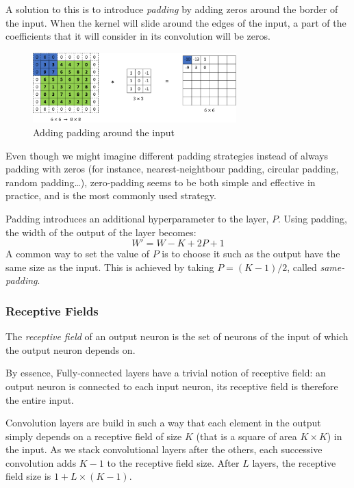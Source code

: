 A solution to this is to introduce \emph{padding} by adding zeros around the border of the input. When the kernel will slide around the edges of the input, a part of the coefficients that it will consider in its convolution will be zeros.
\begin{figure}[H]
    \centering
    \includegraphics[width=0.7\textwidth]{images/padding.png}
    \caption{Adding padding around the input}
\end{figure}

\begin{remark}
    Even though we might imagine different padding strategies instead of always padding with zeros (for instance, nearest-neightbour padding, circular padding, random padding\dots), zero-padding seems to be both simple and effective in practice, and is the most commonly used strategy.
\end{remark}

Padding introduces an additional hyperparameter to the layer, $P$. 
Using padding, the width of the output of the layer becomes:
\begin{equation}
    \label{eq:output-padding}
    W'=W-K+2P+1
\end{equation}
A common way to set the value of $P$ is to choose it such as the output have the same size as the input. This is achieved by taking $P=(K-1)/2$, called \emph{same-padding}.

\subsubsection{Receptive Fields}
\begin{definition}
    The \emph{receptive field} of an output neuron is the set of neurons of the input of which the output neuron depends on.
\end{definition}

By essence, Fully-connected layers have a trivial notion of receptive field: an output neuron is connected to each input neuron, its receptive field is therefore the entire input.

Convolution layers are build in such a way that each element in the output simply depends on a receptive field of size $K$ (that is a square of area $K\times K$) in the input. As we stack convolutional layers after the others, each successive convolution adds $K-1$ to the receptive field size. After $L$ layers, the receptive field size is $1+L\times(K-1)$. 

